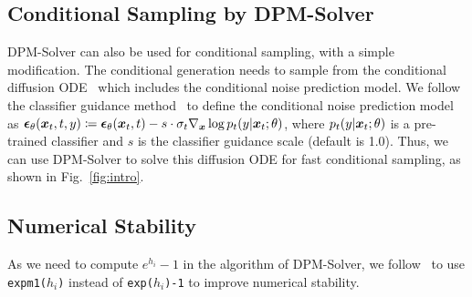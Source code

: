 \subsection{Conditional Sampling by DPM-Solver}
DPM-Solver can also be used for conditional sampling, with a simple modification. The conditional generation needs to sample from the conditional diffusion ODE~\citep{song2020score, dhariwal2021diffusion} which includes the conditional noise prediction model. We follow the classifier guidance method~\citep{dhariwal2021diffusion} to define the conditional noise prediction model as $\bm{\epsilon}_\theta(\bm{x}_t,t,y)\coloneqq \bm{\epsilon}_\theta(\bm{x}_t,t) - s \cdot \sigma_t\nabla_{\bm{x}}\log p_t(y|\bm{x}_t;\theta)$, where $p_t(y|\bm{x}_t;\theta)$ is a pre-trained classifier and $s$ is the classifier guidance scale (default is 1.0). Thus, we can use DPM-Solver to solve this diffusion ODE for fast conditional sampling, as shown in Fig.~\ref{fig:intro}.




\subsection{Numerical Stability}
As we need to compute $e^{h_i} - 1$ in the algorithm of DPM-Solver, we follow~\citep{kingma2021variational} to use \texttt{expm1($h_i$)} instead of \texttt{exp($h_i$)-1} to improve numerical stability.